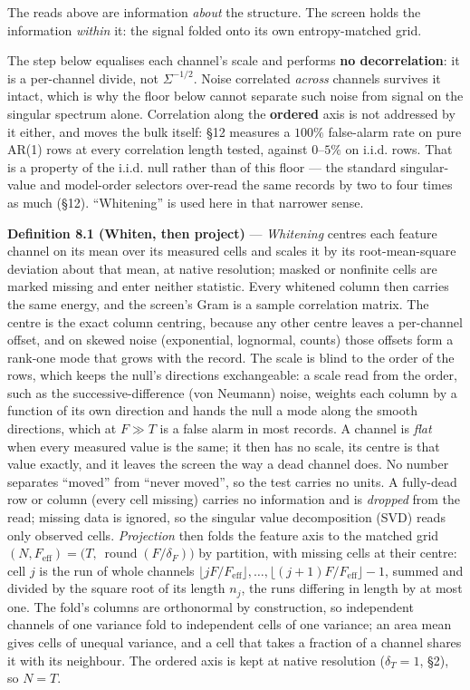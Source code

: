 \documentclass[10pt,letterpaper,twocolumn]{article}
\begin{document}
The reads above are information \emph{about} the structure. The screen holds the information \emph{within} it: the signal folded onto its own entropy-matched grid.

The step below equalises each channel's scale and performs \textbf{no decorrelation}: it is a per-channel divide, not \(\Sigma^{-1/2}\). Noise correlated \emph{across} channels survives it intact, which is why the floor below cannot separate such noise from signal on the singular spectrum alone. Correlation along the \textbf{ordered} axis is not addressed by it either, and moves the bulk itself: §12 measures a \(100\%\) false-alarm rate on pure AR(1) rows at every correlation length tested, against \(0\)--\(5\%\) on i.i.d. rows. That is a property of the i.i.d. null rather than of this floor --- the standard singular-value and model-order selectors over-read the same records by two to four times as much (§12). ``Whitening'' is used here in that narrower sense.

\textbf{Definition 8.1 (Whiten, then project)} --- \emph{Whitening} centres each feature channel on its mean over its measured cells and scales it by its root-mean-square deviation about that mean, at native resolution; masked or nonfinite cells are marked missing and enter neither statistic. Every whitened column then carries the same energy, and the screen's Gram is a sample correlation matrix. The centre is the exact column centring, because any other centre leaves a per-channel offset, and on skewed noise (exponential, lognormal, counts) those offsets form a rank-one mode that grows with the record. The scale is blind to the order of the rows, which keeps the null's directions exchangeable: a scale read from the order, such as the successive-difference (von Neumann) noise, weights each column by a function of its own direction and hands the null a mode along the smooth directions, which at \(F\gg T\) is a false alarm in most records. A channel is \emph{flat} when every measured value is the same; it then has no scale, its centre is that value exactly, and it leaves the screen the way a dead channel does. No number separates ``moved'' from ``never moved'', so the test carries no units. A fully-dead row or column (every cell missing) carries no information and is \emph{dropped} from the read; missing data is ignored, so the singular value decomposition (SVD) reads only observed cells. \emph{Projection} then folds the feature axis to the matched grid \((N,F_{\mathrm{eff}})=\big(T,\ \operatorname{round}(F/\delta_F)\big)\) by partition, with missing cells at their centre: cell \(j\) is the run of whole channels \(\lfloor jF/F_{\mathrm{eff}}\rfloor,\dots,\lfloor (j+1)F/F_{\mathrm{eff}}\rfloor-1\), summed and divided by the square root of its length \(n_j\), the runs differing in length by at most one. The fold's columns are orthonormal by construction, so independent channels of one variance fold to independent cells of one variance; an area mean gives cells of unequal variance, and a cell that takes a fraction of a channel shares it with its neighbour. The ordered axis is kept at native resolution (\(\delta_T=1\), §2), so \(N=T\).
\end{document}
